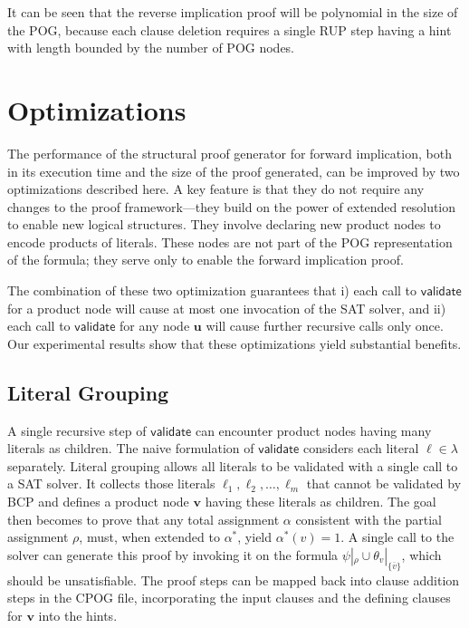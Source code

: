 \documentclass[twoside,11pt]{article}
\newcommand{\obar}[1]{\overline{#1}}
\newcommand{\lit}{\ell}
\newcommand{\extend}[1]{#1^{*}}
\newcommand{\assign}{\alpha}
\newcommand{\eassign}{\extend{\alpha}}
\newcommand{\passign}{\rho}
\newcommand{\validate}{\textsf{validate}}
\newcommand{\makenode}[1]{\mathbf{#1}}
\newcommand{\nodeu}{\makenode{u}}
\newcommand{\nodev}{\makenode{v}}
\newcommand{\simplify}[2]{#1|_{#2}}
\begin{document}
It can be seen that the reverse implication proof will be polynomial in the size of the POG\@, because
each clause deletion requires a single RUP step having a hint with length
bounded by the number of POG nodes.

\section{Optimizations}

The performance of the structural proof generator for forward implication, both in its execution time and
the size of the proof generated, can be improved by two optimizations
described here.  A key feature is that they do not require any changes
to the proof framework---they build on the power of extended
resolution to enable new logical structures.  They
involve declaring new product nodes to encode products of literals.
These nodes are not part of the POG
representation of the formula; they serve only to enable the forward
implication proof.

The combination of these two optimization guarantees that i) each call
to $\validate$ for a product node will cause at most one invocation of
the SAT solver, and ii) each call to $\validate$ for any node $\nodeu$
will cause further recursive calls only once.  Our experimental
results show that these
optimizations yield substantial benefits.


\subsection{Literal Grouping}
\label{sect:grouping}

A single recursive step of $\validate$ can encounter product nodes
having many literals as children.  The naive formulation of $\validate$
considers each literal $\lit \in \lambda$ separately.
Literal grouping allows all literals to be validated with a single call to a SAT solver.
It collects those literals
$\lit_1, \lit_2, \ldots, \lit_m$ that cannot be validated by BCP and defines a
product node $\nodev$ having these literals as children.  The goal
then becomes to prove that any total assignment $\assign$ consistent with the partial assignment $\passign$,
must, when extended to $\eassign$, yield $\eassign(v) = 1$.
A single call to the solver can generate this proof by invoking it on the formula
  $\simplify{\psi}{\passign} \cup \simplify{\theta_{v}}{\{ \obar{v} \}}$, which should be unsatisfiable.
  The proof steps can be mapped back into clause addition steps in the CPOG file, incorporating the
  input clauses and the defining clauses for $\nodev$ into the hints.
\end{document}
